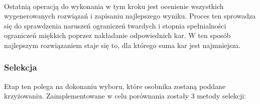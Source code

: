 \paragraph{}Ostatnią operacją do wykonania w tym kroku jest ocenienie wszystkich wygenerowanych rozwiązań i zapisaniu najlepszego wyniku. Proces ten sprowadza się do sprawdzenia naruszeń ograniczeń twardych i stopnia spełnialności ograniczeń miękkich poprzez nakładanie odpowiednich kar. W ten sposób najlepszym rozwiązaniem staje się to, dla którego suma kar jest najmniejsza.
\subsubsection{Selekcja}
Etap ten polega na dokonaniu wyboru, które osobnika zostaną poddane krzyżowaniu. Zaimplementowane w celu porównania zostały 3 metody selekcji:
